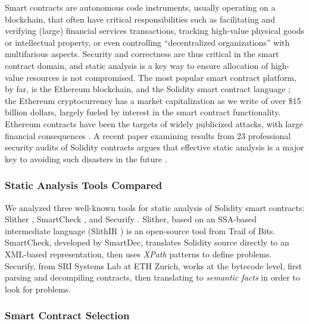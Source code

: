 Smart contracts are autonomous code instruments, usually operating on a blockchain, that often have critical responsibilities such as facilitating and verifying (large) financial services transactions, tracking high-value physical goods or intellectual property, or even controlling ``decentralized organizations'' with multifarious aspects.  Security and correctness are thus critical in the smart contract domain, and static analysis is a key way to ensure allocation of high-value resources is not compromised.  The most popular smart contract platform, by far, is the Ethereum blockchain, and the Solidity smart contract language \cite{buterin2013whitepaper,wood2014yellow}; the Ethereum cryptocurrency has a market capitalization as we write of over \$15 billion dollars, largely fueled by interest in the smart contract functionality.  Ethereum contracts have been the targets of widely publicized attacks, with large financial consequences  \cite{spank,DAO}.   A recent paper examining results from 23 professional security audits of Solidity contracts argues that effective static analysis is a major key to avoiding such disasters in the future \cite{FC20}.

\subsubsection{Static Analysis Tools Compared}

We analyzed three well-known tools for static analysis of Solidity smart contracts: Slither \cite{slither}, SmartCheck \cite{smartcheck}, and Securify \cite{Securify}.  Slither, based on an SSA-based intermediate language (SlithIR \cite{slither}) is an open-source tool from Trail of Bits.  SmartCheck, developed by SmartDec, translates Solidity source directly to an XML-based representation, then uses \emph{XPath} patterns to define problems.  Securify, from SRI Systems Lab at ETH Zurich, works at the bytecode level, first parsing and decompiling contracts, then translating to \emph{semantic facts} in order to look for problems.

\subsubsection{Smart Contract Selection}

